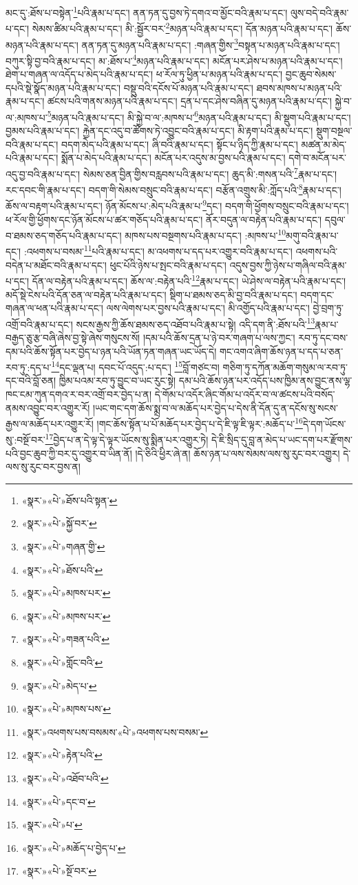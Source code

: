 མང་དུ་:ཐོས་པ་བསྟེན་\footnote{«སྣར་»«པེ་»ཐོས་པའི་སྟན་}པའི་རྣམ་པ་དང་། ནན་ཏན་དུ་བྱས་ཏེ་དགའ་བ་མྱོང་བའི་རྣམ་པ་དང་། ལུས་བདེ་བའི་རྣམ་པ་དང་། སེམས་ཚིམ་པའི་རྣམ་པ་དང་། མི་:སྦྱོར་བར་\footnote{«སྣར་»«པེ་»སྐྱོ་བར་}མཉན་པའི་རྣམ་པ་དང་། དོན་མཉན་པའི་རྣམ་པ་དང་། ཆོས་མཉན་པའི་རྣམ་པ་དང་། ནན་ཏན་དུ་མཉན་པའི་རྣམ་པ་དང་། :གཞན་གྱིས་\footnote{«སྣར་»«པེ་»གཞན་གྱི་}བསྟན་པ་མཉན་པའི་རྣམ་པ་དང་། བཀུར་སྟི་བྱ་བའི་རྣམ་པ་དང་། མ་:ཐོས་པ་\footnote{«སྣར་»«པེ་»ཐོས་པའི་}མཉན་པའི་རྣམ་པ་དང་། མངོན་པར་ཤེས་པ་མཉན་པའི་རྣམ་པ་དང་། ཐེག་པ་གཞན་ལ་འདོད་པ་མེད་པའི་རྣམ་པ་དང་། ཕ་རོལ་ཏུ་ཕྱིན་པ་མཉན་པའི་རྣམ་པ་དང་། བྱང་ཆུབ་སེམས་དཔའི་སྡེ་སྣོད་མཉན་པའི་རྣམ་པ་དང་། བསྡུ་བའི་དངོས་པོ་མཉན་པའི་རྣམ་པ་དང་། ཐབས་མཁས་པ་མཉན་པའི་རྣམ་པ་དང་། ཚངས་པའི་གནས་མཉན་པའི་རྣམ་པ་དང་། དྲན་པ་དང་ཤེས་བཞིན་དུ་མཉན་པའི་རྣམ་པ་དང་། སྐྱེ་བ་ལ་:མཁས་པ་\footnote{«སྣར་»«པེ་»མཁས་པར་}མཉན་པའི་རྣམ་པ་དང་། མི་སྐྱེ་བ་ལ་:མཁས་པ་\footnote{«སྣར་»«པེ་»མཁས་པར་}མཉན་པའི་རྣམ་པ་དང་། མི་སྡུག་པའི་རྣམ་པ་དང་། བྱམས་པའི་རྣམ་པ་དང་། རྐྱེན་དང་འདུ་བ་ཚོགས་ཏེ་འབྱུང་བའི་རྣམ་པ་དང་། མི་རྟག་པའི་རྣམ་པ་དང་། སྡུག་བསྔལ་བའི་རྣམ་པ་དང་། བདག་མེད་པའི་རྣམ་པ་དང་། ཞི་བའི་རྣམ་པ་དང་། སྟོང་པ་ཉིད་ཀྱི་རྣམ་པ་དང་། མཚན་མ་མེད་པའི་རྣམ་པ་དང་། སྨོན་པ་མེད་པའི་རྣམ་པ་དང་། མངོན་པར་འདུས་མ་བྱས་པའི་རྣམ་པ་དང་། དགེ་བ་མངོན་པར་འདུ་བྱ་བའི་རྣམ་པ་དང་། སེམས་ཅན་བྱིན་གྱིས་བརླབས་པའི་རྣམ་པ་དང་། ཆུད་མི་:གསན་པའི་\footnote{«སྣར་»«པེ་»གཟན་པའི་}རྣམ་པ་དང་། རང་དབང་གི་རྣམ་པ་དང་། བདག་གི་སེམས་བསྲུང་བའི་རྣམ་པ་དང་། བརྩོན་འགྲུས་མི་:ཀློད་པའི་\footnote{«སྣར་»«པེ་»གློང་བའི་}རྣམ་པ་དང་། ཆོས་ལ་བརྟག་པའི་རྣམ་པ་དང་། ཉོན་མོངས་པ་:མེད་པའི་རྣམ་པ་\footnote{«སྣར་»«པེ་»མེད་པ་}དང་། བདག་གི་ཕྱོགས་བསྲུང་བའི་རྣམ་པ་དང་། ཕ་རོལ་གྱི་ཕྱོགས་དང་ཉོན་མོངས་པ་ཚར་གཅོད་པའི་རྣམ་པ་དང་། ནོར་བདུན་ལ་བརྟེན་པའི་རྣམ་པ་དང་། དབུལ་བ་ཐམས་ཅད་གཅོད་པའི་རྣམ་པ་དང་། མཁས་པས་བསྔགས་པའི་རྣམ་པ་དང་། :མཁས་པ་\footnote{«སྣར་»«པེ་»མཁས་པས་}མགུ་བའི་རྣམ་པ་དང་། :འཕགས་པ་བསམ་\footnote{«སྣར་»འཕགས་པས་བསམས་«པེ་»འཕགས་པས་བསམ་}པའི་རྣམ་པ་དང་། མ་འཕགས་པ་དད་པར་འགྱུར་བའི་རྣམ་པ་དང་། འཕགས་པའི་བདེན་པ་མཐོང་བའི་རྣམ་པ་དང་། ཕུང་པོའི་ཉེས་པ་སྤང་བའི་རྣམ་པ་དང་། འདུས་བྱས་ཀྱི་ཉེས་པ་གཞིལ་བའི་རྣམ་པ་དང་། དོན་ལ་བརྟེན་པའི་རྣམ་པ་དང་། ཆོས་ལ་:བརྟེན་པའི་\footnote{«སྣར་»«པེ་»རྟེན་པའི་}རྣམ་པ་དང་། ཡེ་ཤེས་ལ་བརྟེན་པའི་རྣམ་པ་དང་། མདོ་སྡེ་ངེས་པའི་དོན་ཅན་ལ་བརྟེན་པའི་རྣམ་པ་དང་། སྡིག་པ་ཐམས་ཅད་མི་བྱ་བའི་རྣམ་པ་དང་། བདག་དང་གཞན་ལ་ཕན་པའི་རྣམ་པ་དང་། ལས་ལེགས་པར་བྱས་པའི་རྣམ་པ་དང་། མི་འགྱོད་པའི་རྣམ་པ་དང་། བྱེ་བྲག་ཏུ་འགྲོ་བའི་རྣམ་པ་དང་། སངས་རྒྱས་ཀྱི་ཆོས་ཐམས་ཅད་འཐོབ་པའི་རྣམ་པ་སྟེ། འདི་དག་ནི་:ཐོས་པའི་\footnote{«སྣར་»«པེ་»འཐོབ་པའི་}རྣམ་པ་བརྒྱད་ཅུ་རྩ་བཞི་ཞེས་བྱ་སྟེ་ཞེས་གསུངས་སོ། །དམ་པའི་ཆོས་དྲན་པ་ཉེ་བར་གཞག་པ་ལས་ཀྱང་། རབ་ཏུ་དང་བས་དམ་པའི་ཆོས་སྟོན་པར་བྱེད་པ་ཉན་པའི་ཡོན་ཏན་གཞན་ཡང་ཡོད་དེ། གང་འགའ་ཞིག་ཆོས་ཉན་པ་དད་པ་ཅན་རབ་ཏུ་:དད་པ་\footnote{«སྣར་»«པེ་»དང་བ་}དང་ལྡན་པ། དབང་པོ་འདུད་:པ་དང་། \footnote{«སྣར་»«པེ་»པ་}བློ་གཙང་བ། གཅིག་ཏུ་དཀོན་མཆོག་གསུམ་ལ་རབ་ཏུ་དང་བའི་བློ་ཅན། ཁྱིམ་པའམ་རབ་ཏུ་བྱུང་བ་ཡང་རུང་སྟེ། དམ་པའི་ཆོས་ཉན་པར་འདོད་པས་ཁྱིམ་ནས་བྱུང་ནས་ལྷ་ཁང་ངམ་ཀུན་དགའ་ར་བར་འགྲོ་བར་བྱེད་པ་ན། དེ་གོམ་པ་འདོར་ཞིང་གོམ་པ་འདོར་བ་ལ་ཚངས་པའི་བསོད་ནམས་འབྱུང་བར་འགྱུར་རོ། །ཡང་གང་དག་ཆོས་སྨྲ་བ་ལ་མཆོད་པར་བྱེད་པ་དེས་ནི་དོན་དུ་ན་དངོས་སུ་སངས་རྒྱས་ལ་མཆོད་པར་འགྱུར་རོ། །གང་ཆོས་སྟོན་པ་པོ་མཆོད་པར་བྱེད་པ་དེ་ཇི་ལྟ་ཇི་ལྟར་:མཆོད་པ་\footnote{«སྣར་»«པེ་»མཆོད་པ་བྱེད་པ་}དེ་དག་ཡོངས་སུ་:བསྔོ་བར་\footnote{«སྣར་»«པེ་»སྔོ་བར་}བྱེད་པ་ན་དེ་ལྟ་དེ་ལྟར་ཡོངས་སུ་སྨིན་པར་འགྱུར་ཏེ། དེ་ཇི་སྲིད་དུ་བླ་ན་མེད་པ་ཡང་དག་པར་རྫོགས་པའི་བྱང་ཆུབ་ཀྱི་བར་དུ་འགྱུར་བ་ཡིན་ནོ། །དེ་ཅིའི་ཕྱིར་ཞེ་ན། ཆོས་ཉན་པ་ལས་སེམས་ལས་སུ་རུང་བར་འགྱུར། དེ་ལས་སུ་རུང་བར་བྱས་ན། 